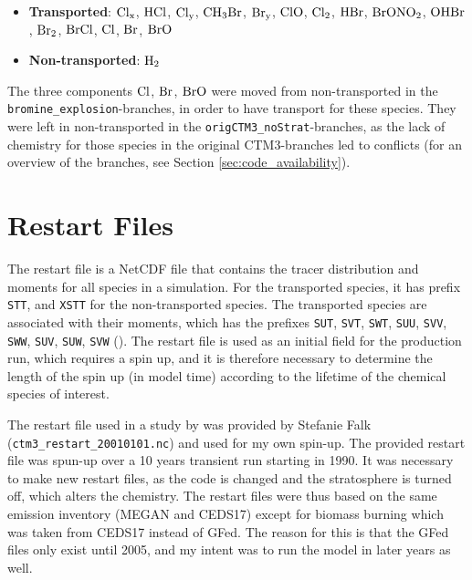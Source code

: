 \begin{itemize}
    \item \textbf{Transported}: $\mathrm{Cl_x}$, $\mathrm{HCl}$, $\mathrm{Cl_y}$, $\mathrm{CH_3Br}$, $\mathrm{Br_y}$, $\mathrm{ClO}$, $\mathrm{Cl_2}$, $\mathrm{HBr}$, $\mathrm{BrONO_2}$, $\mathrm{OHBr}$, $\mathrm{Br_2}$, $\mathrm{BrCl}$, $\mathrm{Cl}$, $\mathrm{Br}$, $\mathrm{BrO}$
    \item \textbf{Non-transported}: $\mathrm{H_2}$
\end{itemize}

The three components $\mathrm{Cl}$, $\mathrm{Br}$, $\mathrm{BrO}$ were moved from non-transported in the \texttt{bromine\_explosion}-branches, in order to have transport for these species. They were left in non-transported in the \texttt{origCTM3\_noStrat}-branches, as the lack of chemistry for those species in the original CTM3-branches led to conflicts (for an overview of the branches, see Section \ref{sec:code_availability}). 




\section{Restart Files}\label{subsec:restart_files}


The restart file is a NetCDF file that contains the tracer distribution and moments for all species in a simulation. For the transported species, it has prefix \texttt{STT}, and \texttt{XSTT} for the non-transported species. The transported species are associated with their moments, which has the prefixes \texttt{SUT}, \texttt{SVT}, \texttt{SWT}, \texttt{SUU}, \texttt{SVV}, \texttt{SWW}, \texttt{SUV}, \texttt{SUW}, \texttt{SVW} (\cite{SovdeManual}). The restart file is used as an initial field for the production run, which requires a spin up, and it is therefore necessary to determine the length of the spin up (in model time) according to the lifetime of the chemical species of interest. 

\medskip

The restart file used in a study by \cite{Falk_2019} was provided by Stefanie Falk (\texttt{ctm3\_restart\_20010101.nc}) and used for my own spin-up. The provided restart file was spun-up over a 10 years transient run starting in 1990. It was necessary to make new restart files, as the code is changed and the stratosphere is turned off, which alters the chemistry. The restart files were thus based on the same emission inventory (MEGAN and CEDS17) except for biomass burning which was taken from CEDS17 instead of GFed. The reason for this is that the GFed files only exist until 2005, and my intent was to run the model in later years as well. 


